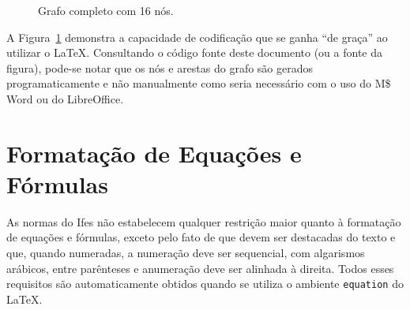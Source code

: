 \documentclass[times,english,brazil,oneside,section=TITLE]{ifes8}
\begin{document}
\begin{figure}[h]
  \centering
  \caption{Grafo completo com 16 nós.}
  \label{fig:ex2}
  \newcount\mycount
\end{figure}

A Figura~\ref{fig:ex2} demonstra a capacidade de codificação que se
ganha ``de graça'' ao utilizar o \LaTeX. Consultando o código fonte
deste documento (ou a fonte da figura), pode-se notar que os nós e
arestas do grafo são gerados programaticamente e não manualmente como
seria necessário com o uso do M\$ Word ou do LibreOffice.


\section{Formatação de Equações e Fórmulas}
\label{sec:format-equac}

As normas do Ifes não estabelecem qualquer restrição maior quanto à
formatação de equações e fórmulas, exceto pelo fato de que devem ser
destacadas do texto e que, quando numeradas, a numeração deve ser
sequencial, com algarismos arábicos, entre parênteses e anumeração
deve ser alinhada à direita. Todos esses requisitos são
automaticamente obtidos quando se utiliza o ambiente \texttt{equation}
do \LaTeX.
\end{document}
